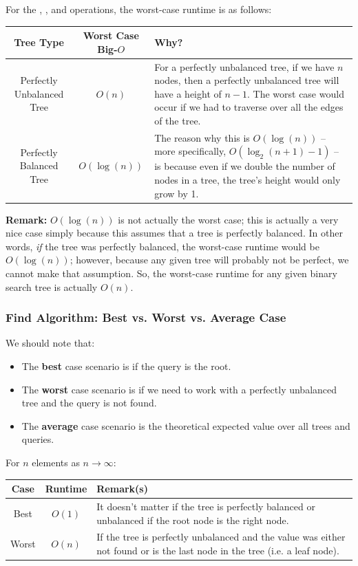 \documentclass[letterpaper]{article}
\begin{document}
For the , , and  operations, the worst-case runtime is as follows: 
\begin{center}
    \begin{tabular}{c|c|p{7cm}}
        \textbf{Tree Type} & \textbf{Worst Case Big-$O$} & \textbf{Why?} \\
        \hline 
        Perfectly Unbalanced Tree & $\boxed{O(n)}$ & For a perfectly unbalanced tree, if we have $n$ nodes, then a perfectly unbalanced tree will have a height of $n - 1$. The worst case would occur if we had to traverse over all the edges of the tree. \\
        Perfectly Balanced Tree   & $O(\log(n))$ & The reason why this is $O(\log(n))$ -- more specifically, $O(\log_{2}(n + 1) - 1)$ -- is because even if we double the number of nodes in a tree, the tree's height would only grow by 1.
    \end{tabular}
\end{center}
\textbf{Remark:} $O(\log(n))$ is not actually the worst case; this is actually a very nice case simply because this assumes that a tree is perfectly balanced. In other words, \emph{if} the tree was perfectly balanced, the worst-case runtime would be $O(\log(n))$; however, because any given tree will probably not be perfect, we cannot make that assumption. So, the worst-case runtime for any given binary search tree is actually $O(n)$. 

\subsubsection{Find Algorithm: Best vs. Worst vs. Average Case}
We should note that: 
\begin{itemize}
    \item The \textbf{best} case scenario is if the query is the root. 
    \item The \textbf{worst} case scenario is if we need to work with a perfectly unbalanced tree and the query is not found. 
    \item The \textbf{average} case scenario is the theoretical expected value over all trees and queries. 
\end{itemize}

For $n$ elements as $n \to \infty$:
\begin{center}
    \begin{tabular}{c|c|p{7cm}}
        \textbf{Case} & \textbf{Runtime} & \textbf{Remark(s)} \\ 
        \hline 
        Best & $O(1)$ & It doesn't matter if the tree is perfectly balanced or unbalanced if the root node is the right node. \\ 
        Worst & $O(n)$ & If the tree is perfectly unbalanced and the value was either not found or is the last node in the tree (i.e. a leaf node). 
    \end{tabular}
\end{center}
\end{document}
